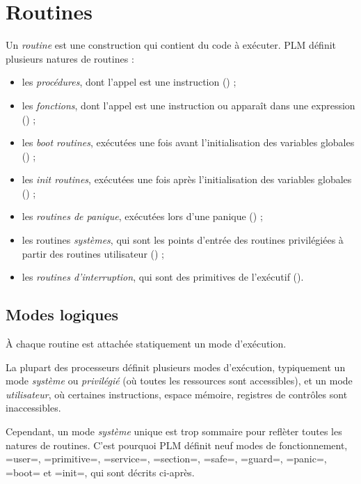 




\chapter{Routines}

Un \emph{routine} est une construction qui contient du code à exécuter. PLM définit plusieurs natures de routines :
\begin{itemize}
  \item les \emph{procédures}, dont l'appel est une instruction () ;
  \item les \emph{fonctions}, dont l'appel est une instruction ou apparaît dans une expression () ;
  \item les \emph{boot routines}, exécutées une fois avant l'initialisation des variables globales () ;
  \item les \emph{init routines}, exécutées une fois après l'initialisation des variables globales () ;
  \item les \emph{routines de panique}, exécutées lors d'une panique () ;
  \item les routines \emph{systèmes}, qui sont les points d'entrée des routines privilégiées à partir des routines utilisateur () ;
  \item les \emph{routines d'interruption}, qui sont des primitives de l'exécutif ().
\end{itemize}


\section{Modes logiques}

À chaque routine est attachée statiquement un mode d'exécution.

La plupart des processeurs définit plusieurs modes d'exécution, typiquement un mode \emph{système} ou \emph{privilégié} (où toutes les ressources sont accessibles), et un mode \emph{utilisateur}, où certaines instructions, espace mémoire, registres de contrôles sont inaccessibles.

Cependant, un mode \emph{système} unique est trop sommaire pour reflèter toutes les natures de routines. C'est pourquoi PLM définit neuf modes de fonctionnement, \plm=user=, \plm=primitive=, \plm=service=, \plm=section=, \plm=safe=, \plm=guard=, \plm=panic=, \plm=boot= et \plm=init=, qui sont décrits ci-après.

